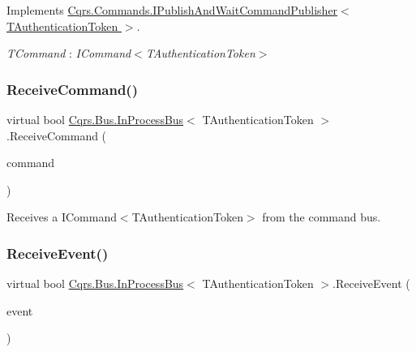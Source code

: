 Implements \hyperlink{interfaceCqrs_1_1Commands_1_1IPublishAndWaitCommandPublisher_a0460fc2091d52ba3463973fea5028bc6_a0460fc2091d52ba3463973fea5028bc6}{Cqrs.\+Commands.\+I\+Publish\+And\+Wait\+Command\+Publisher$<$ T\+Authentication\+Token $>$}.

\begin{Desc}
\item[Type Constraints]\begin{description}
\item[{\em T\+Command} : {\em I\+Command$<$T\+Authentication\+Token$>$}]\end{description}
\end{Desc}
\mbox{\label{classCqrs_1_1Bus_1_1InProcessBus_afa5b4def79709baa28fbd15c215a4111_afa5b4def79709baa28fbd15c215a4111}} 
\subsubsection{\texorpdfstring{Receive\+Command()}{ReceiveCommand()}}
{\footnotesize\ttfamily virtual bool \hyperlink{classCqrs_1_1Bus_1_1InProcessBus}{Cqrs.\+Bus.\+In\+Process\+Bus}$<$ T\+Authentication\+Token $>$.Receive\+Command (\begin{DoxyParamCaption}\item[{\hyperlink{interfaceCqrs_1_1Commands_1_1ICommand}{I\+Command}$<$ T\+Authentication\+Token $>$}]{command }\end{DoxyParamCaption})\hspace{0.3cm}{\ttfamily [virtual]}}



Receives a I\+Command$<$\+T\+Authentication\+Token$>$ from the command bus. 

\mbox{\label{classCqrs_1_1Bus_1_1InProcessBus_aab52f8518371f5ff5e3f193b1234f192_aab52f8518371f5ff5e3f193b1234f192}} 
\subsubsection{\texorpdfstring{Receive\+Event()}{ReceiveEvent()}}
{\footnotesize\ttfamily virtual bool \hyperlink{classCqrs_1_1Bus_1_1InProcessBus}{Cqrs.\+Bus.\+In\+Process\+Bus}$<$ T\+Authentication\+Token $>$.Receive\+Event (\begin{DoxyParamCaption}\item[{\hyperlink{interfaceCqrs_1_1Events_1_1IEvent}{I\+Event}$<$ T\+Authentication\+Token $>$ @}]{event }\end{DoxyParamCaption})\hspace{0.3cm}{\ttfamily [virtual]}}



